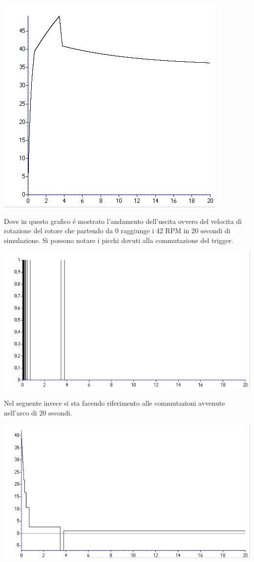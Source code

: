 \documentclass[a4paper,13pt]{article}
\begin{document}
\begin{center}
\includegraphics[scale=0.6]{PLOT_OMEGA.png}
\end{center}
Dove in questo grafico \'e mostrato l'andamento dell'uscita ovvero del velocita di rotazione del rotore che partendo da 0 raggiunge i 42 RPM in 20 secondi di simulazione.
Si possono notare i picchi dovuti alla commutazione del trigger.
\begin{center}
\includegraphics[scale=0.6]{PLOT_ET.png}
\end{center}
Nel seguente invece si sta facendo riferimento alle commutazioni avvenute nell'arco di 20 secondi.
\begin{center}
\includegraphics[scale=0.6]{PLOT_UD.png}
\end{center} 
\end{document}
